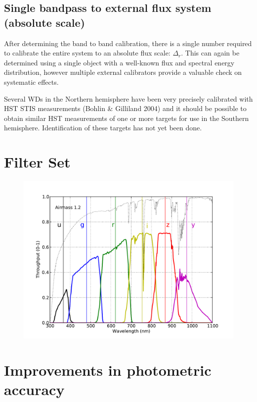 \documentclass[12pt,preprint]{aastex}
\begin{document}
\subsection{Single bandpass to external flux system (absolute scale)}

After determining the band to band calibration, there is a single
number required to calibrate the entire system to an absolute flux
scale: $\Delta_r$.  This can again be determined using a single
object with a well-known flux and spectral energy distribution,
however multiple external calibrators provide a valuable check on
systematic effects. 

Several WDs in the Northern hemisphere have been very precisely
calibrated with HST STIS measurements (Bohlin \& Gilliland 2004) and
it should be possible to obtain similar HST measurements of one or
more targets for use in the Southern hemisphere. Identification of
these targets has not yet been done. 







\appendix

\newpage
\section{Filter Set}

\begin{figure}[h!]
\includegraphics[width=5in]{filters}
\end{figure}


\section{Improvements in photometric accuracy}
\label{sec:photo_better}
\end{document}
